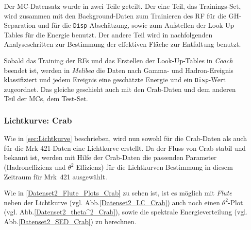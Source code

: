 Der MC-Datensatz wurde in zwei Teile geteilt.
Der eine Teil, das Trainings-Set, wird zusammen mit den Background-Daten zum Trainieren des RF für die GH-Separation und für die \texttt{Disp}-Abschätzung, sowie zum Aufstellen der Look-Up-Tables für die Energie benutzt.
Der andere Teil wird in nachfolgenden Analyseschritten zur Bestimmung der effektiven Fläche zur Entfaltung benutzt.

Sobald das Training der RFs und das Erstellen der Look-Up-Tables in \textit{Coach} beendet ist, werden in \textit{Melibea} die Daten nach Gamma- und Hadron-Ereignis klassifiziert und jedem Ereignis eine geschätzte Energie und ein \texttt{Disp}-Wert zugeordnet.
Das gleiche geschieht auch mit den Crab-Daten und dem anderen Teil der MCs, dem Test-Set.


\subsubsection{Lichtkurve: Crab}
Wie in \autoref{sec:Lichtkurve} beschrieben, wird nun sowohl für die Crab-Daten als auch für die Mrk 421-Daten eine Lichtkurve erstellt.
Da der Fluss von Crab stabil und bekannt ist, werden mit Hilfe der Crab-Daten die passenden Parameter (Hadroneffizienz und $\theta^2$-Effizienz) für die Lichtkurven-Bestimmung in diesem Zeitraum für Mrk~421 ausgewählt.

Wie in \autoref{Datenset2_Flute_Plots_Crab} zu sehen ist, ist es möglich mit \textit{Flute} neben der Lichtkurve (vgl. Abb.\ref{Datenset2_LC_Crab}) auch noch einen $\theta^2$-Plot (vgl. Abb.\ref{Datenset2_theta^2_Crab}), sowie die spektrale Energieverteilung (vgl. Abb.\ref{Datenset2_SED_Crab}) zu berechnen.

